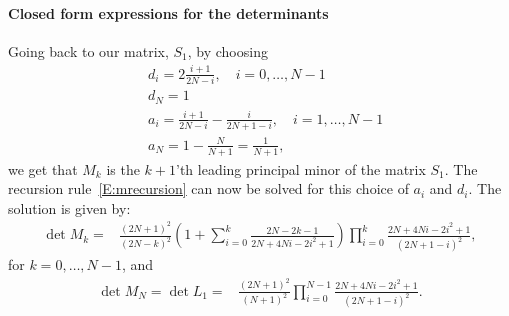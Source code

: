 \documentclass[12pt]{article}
\numberwithin{equation}{section}
\theoremstyle{definition}
\theoremstyle{remark}
\begin{document}
\paragraph{Closed form expressions for the determinants}
Going back to our matrix, $S_1$, by choosing
\begin{align*}
    & d_i = 2\frac{i+1}{2 N-i},\quad i=0,\dots,N-1 \\
    & d_N = 1 \\
    & a_i = \frac{i+1}{2 N-i}-\frac{i}{2 N+1-i},\quad i=1,\dots,N-1\\
    & a_N = 1-\frac{N}{N+1} = \frac{1}{N+1},
\end{align*}
we get that $M_k$ is the $k+1$'th leading principal minor of the matrix $S_1$.
The recursion rule~\eqref{E:mrecursion} can now be solved for this choice of $a_i$ and $d_i$. The solution is given by:
\begin{align}
    \det M_k =& \frac{(2N+1)^2}{(2N-k)^2} \left( 1 +\sum_{i=0}^k \frac{2N-2k-1}{2N+4 N i - 2 i^2+1}\right) \prod_{i=0}^{k} \frac{2N+4Ni-2i^2+1}{(2N+1-i)^2},  \label{E:mkdet}
\end{align}
for $k=0,\dots,N-1$, and
\begin{align}
    \det M_N = \det L_1
        =& \frac{(2N+1)^2}{(N+1)^2}\prod_{i=0}^{N-1} \frac{2N+4Ni-2i^2+1}{(2N+1-i)^2} \label{E:mndet}.
\end{align}
\end{document}
